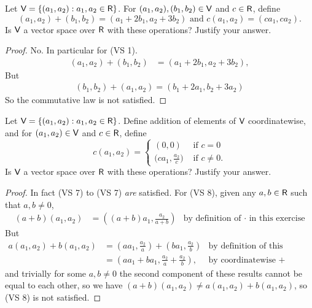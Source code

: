 \begin{exercise} \label{exercise 1.2.18}
Let \(\textsf{V} = \{(a_1, a_2) : a_1, a_2 \in \textsf{R}\}\).
For \((a_1, a_2), (b_1, b_2) \in \textsf{V}\) and \(c \in \textsf{R}\), define
\[
    (a_1, a_2) + (b_1, b_2) = (a_1 + 2b_1, a_2 + 3b_2) \text{ and } c(a_1, a_2) = (ca_1, ca_2).
\]
Is \(\textsf{V}\) a vector space over \(\textsf{R}\) with these operations?
Justify your answer.
\end{exercise}

\begin{proof}
No.
In particular for (VS 1).
\begin{align*}
    (a_1, a_2) + (b_1, b_2) & = (a_1 + 2b_1, a_2 + 3b_2),
\end{align*}
But
\begin{align*}
    (b_1, b_2) + (a_1, a_2) = (b_1 + 2a_1, b_2 + 3a_2)
\end{align*}
So the commutative law is not satisfied.
\end{proof}

\begin{exercise} \label{exercise 1.2.19}
Let \(\textsf{V} = \{(a_1, a_2 ) : a_1, a_2 \in \textsf{R}\}\).
Define addition of elements of \(\textsf{V}\) coordinatewise, and for \((a_1, a_2) \in \textsf{V}\) and \(c \in \textsf{R}\), define
\begin{equation*}
    c(a_1, a_2) =
    \begin{cases}
        (0, 0) & \text{ if } c = 0 \\
        \Big(c a_1, \frac{a_2}{c}\Big) & \text{ if } c \ne 0.
    \end{cases}
\end{equation*}
Is \(\textsf{V}\) a vector space over \(\textsf{R}\) with these operations?
Justify your answer.
\end{exercise}

\begin{proof}
In fact  (VS 7) to (VS 7) \emph{are} satisfied.
For (VS 8), given any \(a, b \in \textsf{R}\) such that \(a, b \ne 0\),
\begin{align*}
    (a + b)(a_1, a_2) & = ((a + b)a_1, \frac{a_2}{a + b}) & \text{by definition of \(\cdot\) in this exercise}
\end{align*}
But
\begin{align*}
    a(a_1, a_2) + b(a_1, a_2) & = (a a_1, \frac{a_2}{a}) + (b a_1, \frac{a_2}{b}) & \text{by definition of this exercise} \\
                              & = (a a_1 + b a_1, \frac{a_2}{a} + \frac{a_2}{b}), & \text{by coordinatewise \(+\)}
\end{align*}
and trivially for some \(a, b \ne 0\) the second component of these results cannot be equal to each other,
so we have \((a + b)(a_1, a_2) \ne a(a_1, a_2) + b(a_1, a_2)\), so (VS 8) is not satisfied.
\end{proof}

